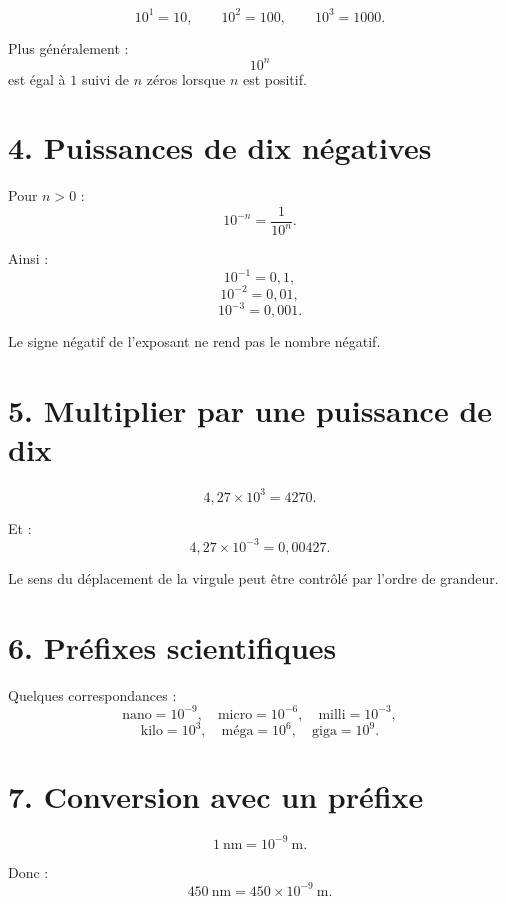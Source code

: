 \[
10^1=10,\qquad 10^2=100,\qquad10^3=1000.
\]

Plus généralement :
\[
10^n
\]
est égal à $1$ suivi de $n$ zéros lorsque $n$ est positif.

\section{4. Puissances de dix négatives}

\begin{definition}
Pour $n>0$ :
\[
\boxed{10^{-n}=\dfrac1{10^n}}.
\]
\end{definition}

Ainsi :
\[
10^{-1}=0{,}1,
\]
\[
10^{-2}=0{,}01,
\]
\[
10^{-3}=0{,}001.
\]

\begin{attention}
Le signe négatif de l'exposant ne rend pas le nombre négatif.
\end{attention}

\section{5. Multiplier par une puissance de dix}

\[
4{,}27\times10^3=4270.
\]

Et :
\[
4{,}27\times10^{-3}=0{,}00427.
\]

Le sens du déplacement de la virgule peut être contrôlé par l'ordre de grandeur.

\section{6. Préfixes scientifiques}


Quelques correspondances :
\[
\text{nano}=10^{-9},\quad
\text{micro}=10^{-6},\quad
\text{milli}=10^{-3},
\]
\[
\text{kilo}=10^3,\quad
\text{méga}=10^6,\quad
\text{giga}=10^9.
\]

\section{7. Conversion avec un préfixe}

\[
1\ \text{nm}=10^{-9}\ \text{m}.
\]

Donc :
\[
450\ \text{nm}=450\times10^{-9}\ \text{m}.
\]

